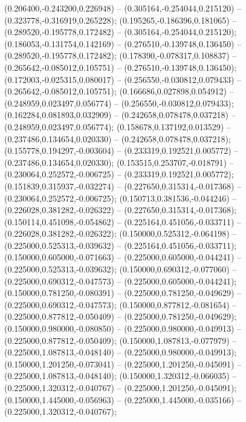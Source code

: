  (0.206400,-0.243200,0.226948) -- (0.305164,-0.254044,0.215120) -- (0.323778,-0.316919,0.265228);
 (0.195265,-0.186396,0.181065) -- (0.289520,-0.195778,0.172482) -- (0.305164,-0.254044,0.215120);
 (0.186053,-0.131754,0.142169) -- (0.276510,-0.139748,0.136450) -- (0.289520,-0.195778,0.172482);
 (0.178390,-0.078317,0.108837) -- (0.265642,-0.085012,0.105751) -- (0.276510,-0.139748,0.136450);
 (0.172003,-0.025315,0.080017) -- (0.256550,-0.030812,0.079433) -- (0.265642,-0.085012,0.105751);
 (0.166686,0.027898,0.054912) -- (0.248959,0.023497,0.056774) -- (0.256550,-0.030812,0.079433);
 (0.162284,0.081893,0.032909) -- (0.242658,0.078478,0.037218) -- (0.248959,0.023497,0.056774);
 (0.158678,0.137192,0.013529) -- (0.237486,0.134654,0.020330) -- (0.242658,0.078478,0.037218);
 (0.155778,0.194297,-0.003604) -- (0.233319,0.192521,0.005772) -- (0.237486,0.134654,0.020330);
 (0.153515,0.253707,-0.018791) -- (0.230064,0.252572,-0.006725) -- (0.233319,0.192521,0.005772);
 (0.151839,0.315937,-0.032274) -- (0.227650,0.315314,-0.017368) -- (0.230064,0.252572,-0.006725);
 (0.150713,0.381536,-0.044246) -- (0.226028,0.381282,-0.026322) -- (0.227650,0.315314,-0.017368);
 (0.150114,0.451098,-0.054862) -- (0.225164,0.451056,-0.033711) -- (0.226028,0.381282,-0.026322);
 (0.150000,0.525312,-0.064198) -- (0.225000,0.525313,-0.039632) -- (0.225164,0.451056,-0.033711);
 (0.150000,0.605000,-0.071663) -- (0.225000,0.605000,-0.044241) -- (0.225000,0.525313,-0.039632);
 (0.150000,0.690312,-0.077060) -- (0.225000,0.690312,-0.047573) -- (0.225000,0.605000,-0.044241);
 (0.150000,0.781250,-0.080391) -- (0.225000,0.781250,-0.049629) -- (0.225000,0.690312,-0.047573);
 (0.150000,0.877812,-0.081654) -- (0.225000,0.877812,-0.050409) -- (0.225000,0.781250,-0.049629);
 (0.150000,0.980000,-0.080850) -- (0.225000,0.980000,-0.049913) -- (0.225000,0.877812,-0.050409);
 (0.150000,1.087813,-0.077979) -- (0.225000,1.087813,-0.048140) -- (0.225000,0.980000,-0.049913);
 (0.150000,1.201250,-0.073041) -- (0.225000,1.201250,-0.045091) -- (0.225000,1.087813,-0.048140);
 (0.150000,1.320312,-0.066035) -- (0.225000,1.320312,-0.040767) -- (0.225000,1.201250,-0.045091);
 (0.150000,1.445000,-0.056963) -- (0.225000,1.445000,-0.035166) -- (0.225000,1.320312,-0.040767);
